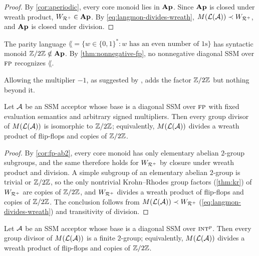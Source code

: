 \documentclass{article}
\begin{document}
\begin{proof}
By \cref{cor:aperiodic}, every core monoid lies in $\mathbf{Ap}$.
Since $\mathbf{Ap}$ is closed under wreath product, $W_{{\mathcal{R}^{+}}} \in \mathbf{Ap}$.
By \cref{eq:langmon-divides-wreath}, $M(\mathcal{L}(\mathcal{A})) \prec W_{{\mathcal{R}^{+}}}$, and $\mathbf{Ap}$ is closed under division.
\end{proof}

\begin{example}\label{ex:parity-fp}
The parity language $\lang = \{ w \in \{0,1\}^* : w \text{ has an even number of } 1\text{s} \}$ has syntactic monoid $\mathbb{Z}/{2}\mathbb{Z} \notin \mathbf{Ap}$.
By \cref{thm:nonnegative-fp}, no nonnegative diagonal SSM over $\textsc{fp}$ recognizes $\lang$.
\end{example}

Allowing the multiplier $-1$, as suggested by \citet{sarrof2024expressive}, adds the factor $\mathbb{Z}/{2}\mathbb{Z}$ but nothing beyond it.

\begin{theorem}\label{thm:fp-smm}
Let $\mathcal{A}$ be an SSM acceptor whose base is a diagonal SSM over $\textsc{fp}$ with fixed evaluation semantics and arbitrary signed multipliers.
Then every group divisor of $M(\mathcal{L}(\mathcal{A}))$ is isomorphic to $\mathbb{Z}/{2}\mathbb{Z}$; equivalently, $M(\mathcal{L}(\mathcal{A}))$ divides a wreath product of flip-flops and copies of $\mathbb{Z}/{2}\mathbb{Z}$.
\end{theorem}

\begin{proof}
By \cref{cor:fp-ab2}, every core monoid has only elementary abelian $2$-group subgroups, and the same therefore holds for $W_{{\mathcal{R}^{+}}}$ by closure under wreath product and division.
A simple subgroup of an elementary abelian $2$-group is trivial or $\mathbb{Z}/{2}\mathbb{Z}$, so the only nontrivial Krohn--Rhodes group factors (\cref{thm:kr}) of $W_{{\mathcal{R}^{+}}}$ are copies of $\mathbb{Z}/{2}\mathbb{Z}$, and $W_{{\mathcal{R}^{+}}}$ divides a wreath product of flip-flops and copies of $\mathbb{Z}/{2}\mathbb{Z}$.
The conclusion follows from $M(\mathcal{L}(\mathcal{A})) \prec W_{{\mathcal{R}^{+}}}$ (\cref{eq:langmon-divides-wreath}) and transitivity of division.
\end{proof}

\begin{theorem}\label{thm:uint-ssm}
Let $\mathcal{A}$ be an SSM acceptor whose base is a diagonal SSM over $\textsc{int}^p$.
Then every group divisor of $M(\mathcal{L}(\mathcal{A}))$ is a finite $2$-group; equivalently, $M(\mathcal{L}(\mathcal{A}))$ divides a wreath product of flip-flops and copies of $\mathbb{Z}/{2}\mathbb{Z}$.
\end{theorem}
\end{document}
